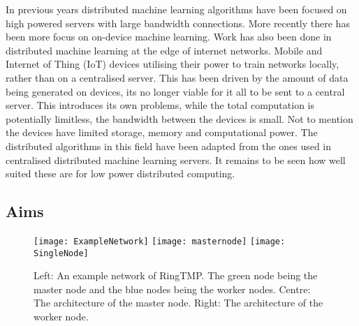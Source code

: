 In previous years distributed machine learning algorithms have been focused on
high powered servers with large bandwidth connections. More recently there has
been more focus on on-device machine learning. Work has also been done in
distributed machine learning at the edge of internet networks. Mobile and
Internet of Thing (IoT) devices utilising their power to train networks locally,
rather than on a centralised server. This has been driven by the amount of data
being generated on devices, its no longer viable for it all to be sent to a
central server. \cite{Chaing2016FogIoT} This introduces its own problems, while
the total computation is potentially limitless, the bandwidth between the
devices is small. Not to mention the devices have limited storage, memory and
computational power. The distributed algorithms in this field have been adapted
from the ones used in centralised distributed machine learning servers. It
remains to be seen how well suited these are for low power distributed
computing.


\subsection{Aims}

\begin{figure}[h]
    \texttt{[image: ExampleNetwork]}
    \texttt{[image: masternode]}
    \texttt{[image: SingleNode]}
    \caption{
            Left: An example network of RingTMP. The green node being the master node and the blue nodes being the worker nodes.
            Centre: The architecture of the master node.
            Right: The architecture of the worker node.
        }
\end{figure}

